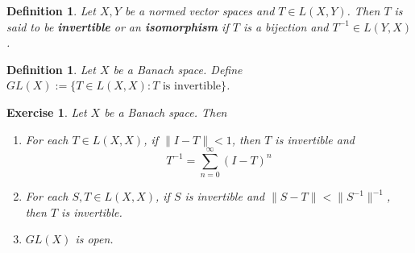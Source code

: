 \documentclass[12pt]{amsart}
\newtheorem{defn}[thm]{Definition}
\newtheorem{ex}[thm]{Exercise}
\begin{document}
	\begin{defn}
		Let $X,Y$ be a normed vector spaces and $T \in L(X,Y)$. Then $T$ is said to be \textbf{invertible} or an \textbf{isomorphism} if $T$ is a bijection and $T^{-1} \in L(Y,X)$.
	\end{defn}
	
	\begin{defn}
		Let $X$ be a Banach space. Define $GL(X) := \{T \in L(X,X): T \text{ is invertible}\}$.
	\end{defn}
	
	\begin{ex}
		Let $X$ be a Banach space. Then 
		\begin{enumerate}
			\item For each $T \in L(X,X)$, if $\|I- T \|< 1$, then $T$ is invertible and $$T^{-1} = \sum_{n=0}^{\infty}(I-T)^n$$
			\item For each $S,T \in L(X,X)$, if $S$ is invertible and $\|S-T \|< \|S^{-1} \|^{-1}$, then $T$ is invertible. 
			\item $GL(X)$ is open.
		\end{enumerate}
	\end{ex}
	
\end{document}
